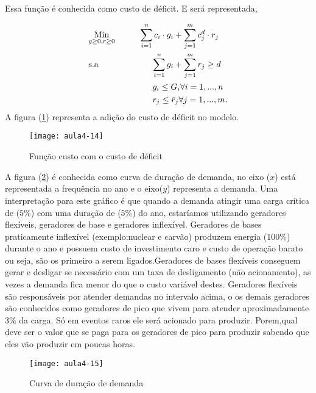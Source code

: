 Essa função é conhecida como custo de déficit. E será representada,

\begin{align}
    & \underset{g\geq0, r\geq0}{\text{Min}} \hspace{1cm} \sum_{i=1}^{n}c_{i}\cdot g_{i} + \sum_{j=1}^{m}c_{j}^{d}\cdot r_{j} \label{eq16} \\
    & \text{s.a}  \hspace{2.2cm} \sum_{i=1}^{n}g_{i} + \sum_{j=1}^{m}r_{j}\geq d \label{eq17} \\
    &             \hspace{2.65cm}g_{i}\leq G_{i} \forall i=1,...,n\label{eq18}\\
    &                \hspace{2.65cm}r_{j}\leq \bar{r}_{j} \forall j=1,...,m.\label{eq19}
\end{align}
A figura (\ref{fig:aula4-14}) representa a adição do custo de déficit no modelo.
\begin{figure}[H]
\begin{centering}
\texttt{[image: aula4-14]}\protect\caption{\label{fig:aula4-14} Função custo com o custo de déficit }
\end{centering}
\end{figure}

A figura (\ref{fig:aula4-15}) é conhecida como curva de duração de demanda, no eixo ($x$) está representada a frequência no ano e o eixo($y$) representa a demanda. Uma interpretação para este gráfico é que quando a demanda atingir uma carga crítica de ($5\%$) com uma duração de ($5\%$) do ano, estaríamos utilizando geradores flexíveis, geradores de base e geradores inflexível. 
Geradores de bases praticamente inflexível (exemplo:nuclear e carvão) produzem energia ($100\%$) durante o ano e possuem custo de investimento caro e custo de operação barato ou seja, são os primeiro a serem ligados.Geradores de bases flexíveis conseguem gerar e desligar se necessário com um taxa de desligamento (não acionamento), as vezes a demanda fica menor do que o custo variável destes. Geradores flexíveis  são responsáveis por atender demandas no intervalo acima, o os demais geradores são conhecidos como geradores de pico que vivem para atender aproximadamente 3\% da carga. Só em eventos raros ele será acionado para produzir. Porem,qual deve ser o valor que se paga para os geradores de pico para produzir sabendo que eles vão produzir em poucas horas.
\begin{figure}[H]
\begin{centering}
\texttt{[image: aula4-15]}\protect\caption{\label{fig:aula4-15}  Curva de duração de demanda}
\end{centering}
\end{figure}

